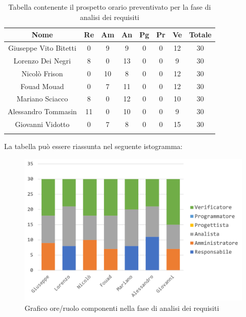			\begin{longtable}{|c|c|c|c|c|c|c|c|}
				\hline
				\rowcolor{lighter-grayer}
				\textbf{Nome} & \textbf{Re} & \textbf{Am} & \textbf{An} & \textbf{Pg}  & \textbf{Pr}   & \textbf{Ve} & \textbf{Totale} \\
				\hline
				\endfirsthead
				
				\hline
				Giuseppe Vito Bitetti & 0 & 9 & 9 & 0 & 0 & 12 & 30\\
				\hline
				\hline
				Lorenzo Dei Negri & 8 & 0 & 13 & 0 & 0 & 9 & 30\\
				\hline
				\hline
				Nicolò Frison & 0 & 10 & 8 & 0 & 0 & 12 & 30\\
				\hline
				\hline
				Fouad Mouad & 0 & 7 & 11 & 0 & 0 & 12 & 30\\
				\hline
				\hline
				Mariano Sciacco & 8 & 0 & 12 & 0 & 0 & 10 & 30\\
				\hline
				\hline
				Alessandro Tommasin & 11 & 0 & 10 & 0 & 0 & 9 & 30\\
				\hline
				\hline
				Giovanni Vidotto & 0 & 7 & 8 & 0 & 0 & 15 & 30\\
				\hline 
				\caption{Tabella contenente il prospetto orario preventivato per la fase di analisi dei requisiti}
			\end{longtable}
			\pagebreak
		
			La tabella può essere riassunta nel seguente istogramma:
		
			\begin{figure}[H]
				\centering
				\includegraphics[width=0.8\linewidth]{./images/preventivo/analisi1.png}
				\caption{Grafico ore/ruolo componenti nella fase di analisi dei requisiti}
				\label{fig:grafico suddivione ruoli fase analisi dei requisiti}
			\end{figure}
		
